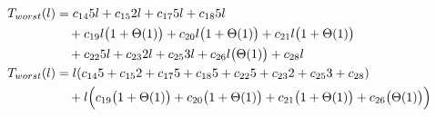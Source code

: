 \begin{subequations}
\label{eq:findlinescorners-2}
\begin{align}
\label{eq:findlinescorners-2-1}
T_{worst}(l)& =
c_{14}5l
+ c_{15}2l
+ c_{17}5l
+ c_{18}5l
\\
& \quad
+ c_{19}l\bigl(1 + \Theta(1)\bigr)
+ c_{20}l\bigl(1 + \Theta(1)\bigr)
+ c_{21}l\bigl(1 + \Theta(1)\bigr)
\nonumber \\
& \quad
+ c_{22}5l
+ c_{23}2l
+ c_{25}3l
+ c_{26}l\bigl(\Theta(1)\bigr)
+ c_{28}l
\nonumber \\
\label{eq:findlinescorners-2-2}
T_{worst}(l)& =
l(c_{14}5 + c_{15}2 + c_{17}5 + c_{18}5 + c_{22}5 + c_{23}2 + c_{25}3 + c_{28})
\\
& \quad
+ l\Bigl(c_{19}\bigl(1 + \Theta(1)\bigr) + c_{20}\bigl(1 + \Theta(1)\bigr) + c_{21}\bigl(1 + \Theta(1)\bigr) + c_{26}\bigl(\Theta(1)\bigr)\Bigr)
\nonumber
\end{align}
\end{subequations}
